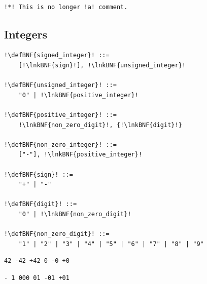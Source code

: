 \documentclass[a4paper]{article}
\newcommand{\defBNF}[1]{\hypertarget{def:#1}{<\detokenize{#1}>}}
\newcommand{\lnkBNF}[1]{\hyperlink{def:#1}{<\detokenize{#1}>}}
\begin{document}
~\\
\begin{minipage}{.49\linewidth}
	\begin{lstlisting}[language=veripb, gobble=4, rulecolor=\color{veripb-valid-text}, caption={Syntactically correct comment.}]
	% This is a comment.
	\end{lstlisting}
\end{minipage}\hfill%
\begin{minipage}{.49\linewidth}
	\begin{lstlisting}[language=veripb, gobble=4, rulecolor=\color{veripb-invalid-text}, caption={Syntactically incorrect comment.}]
	!*! This is no longer !a! comment.
	\end{lstlisting}
\end{minipage}


\subsection{Integers}\label{sec:integers}
\begin{lstlisting}
!\defBNF{signed_integer}! ::=
	[!\lnkBNF{sign}!], !\lnkBNF{unsigned_integer}!

!\defBNF{unsigned_integer}! ::=
	"0" | !\lnkBNF{positive_integer}!

!\defBNF{positive_integer}! ::=
	!\lnkBNF{non_zero_digit}!, {!\lnkBNF{digit}!}

!\defBNF{non_zero_integer}! ::=
	["-"], !\lnkBNF{positive_integer}!

!\defBNF{sign}! ::=
	"+" | "-"

!\defBNF{digit}! ::=
	"0" | !\lnkBNF{non_zero_digit}!

!\defBNF{non_zero_digit}! ::=
	"1" | "2" | "3" | "4" | "5" | "6" | "7" | "8" | "9"
\end{lstlisting}
\begin{minipage}{.49\linewidth}
	\begin{lstlisting}[language=veripb, gobble=4, rulecolor=\color{veripb-valid-text}, caption={Syntactically correct signed integers.}]
	42 -42 +42 0 -0 +0
	\end{lstlisting}
\end{minipage}\hfill%
\begin{minipage}{.49\linewidth}
	\begin{lstlisting}[language=veripb, gobble=4, rulecolor=\color{veripb-invalid-text}, caption={Syntactically incorrect signed integers.}]
	- 1 000 01 -01 +01
	\end{lstlisting}
\end{minipage}
\end{document}
